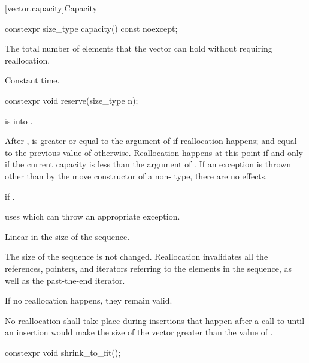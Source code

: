 [vector.capacity]{Capacity}

%
\begin{itemdecl}
constexpr size_type capacity() const noexcept;
\end{itemdecl}

\begin{itemdescr}
\pnum
\returns
The total number of elements that the vector can hold
without requiring reallocation.

\pnum
\complexity
Constant time.
\end{itemdescr}

%
\begin{itemdecl}
constexpr void reserve(size_type n);
\end{itemdecl}

\begin{itemdescr}
\pnum
\expects
{} is  into .

\pnum
\effects
After
,
is greater or equal to the argument of
if reallocation happens; and equal to the previous value of
otherwise.
Reallocation happens at this point if and only if the current capacity is less than the
argument of
. If an exception is thrown
other than by the move constructor of a non- type,
there are no effects.

\pnum
\throws
{} if .
\begin{footnote}
 uses  which
can throw an appropriate exception.
\end{footnote}

\pnum
\complexity
Linear in the size of the sequence.

\pnum
\remarks
The size of the sequence is not changed.
Reallocation invalidates all the references, pointers, and iterators
referring to the elements in the sequence, as well as the past-the-end iterator.
\begin{note}
If no reallocation happens, they remain valid.
\end{note}
No reallocation shall take place during insertions that happen
after a call to 
until an insertion would make the size of the vector
greater than the value of .
\end{itemdescr}

%
\begin{itemdecl}
constexpr void shrink_to_fit();
\end{itemdecl}

